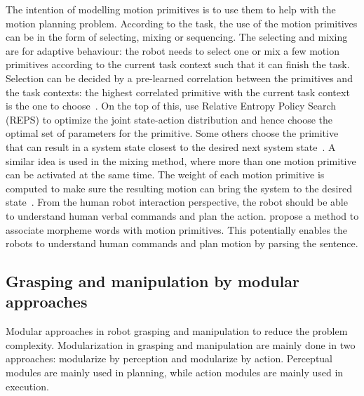 The intention of modelling motion primitives is to use them to help with the motion planning problem. According to the task, the use of the motion primitives can be in the form of selecting, mixing or sequencing. The selecting and mixing are for adaptive behaviour: the robot needs to select one or mix a few motion primitives according to the current task context such that it can finish the task.
Selection can be decided by a pre-learned correlation between the primitives and the task contexts: the highest correlated primitive with the current task context is the one to choose~\citep{takano2006primitive}. On the top of this, \citet{daniel2013learning} use Relative Entropy Policy Search (REPS) to optimize the joint state-action distribution and hence choose the optimal set of parameters for the primitive.
Some others choose the primitive that can result in a system state closest to the desired next system state~\citep{hauser2008using}. A similar idea is used in the mixing method, where more than one motion primitive can be activated at the same time. The weight of each motion primitive is computed to make sure the resulting motion can bring the system to the desired state~\citep{bidan2013robio,sugimoto2012emosaic}. From the human robot interaction perspective, the robot should be able to understand human verbal commands and plan the action. \citet{takano2008integrating} propose a method to associate morpheme words with motion primitives. This potentially enables the robots to understand human commands and plan motion by parsing the sentence.




\subsection{Grasping and manipulation by modular approaches}
\label{cha2:sec3:grasping-modular}

Modular approaches in robot grasping and manipulation to reduce the problem complexity. Modularization in grasping and manipulation are mainly done in two approaches: modularize by perception and modularize by action. Perceptual modules are mainly used in planning, while action modules are mainly used in execution.

